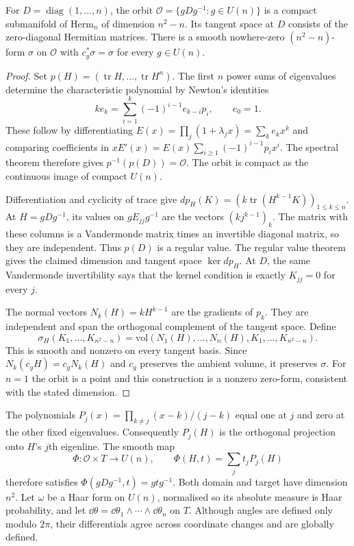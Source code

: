 \begin{lemma}\label{lem:orbit}
For $D=\operatorname{diag}(1,\ldots,n)$, the orbit
$\mathcal O=\{gDg^{-1}:g\in U(n)\}$ is a compact submanifold of
$\mathrm{Herm}_n$ of dimension $n^2-n$.
Its tangent space at $D$ consists of the zero-diagonal Hermitian matrices.
There is a smooth nowhere-zero $(n^2-n)$-form $\sigma$ on $\mathcal O$
with $c_g^*\sigma=\sigma$ for every $g\in U(n)$.
\end{lemma}
\begin{proof}
Set $p(H)=(\operatorname{tr}H,\ldots,\operatorname{tr}H^n)$.
The first $n$ power sums of eigenvalues determine the characteristic
polynomial by Newton's identities
\[
 ke_k=\sum_{i=1}^k(-1)^{i-1}e_{k-i}p_i,\qquad e_0=1.
\]
These follow by differentiating
$E(x)=\prod_j(1+\lambda_jx)=\sum_ke_kx^k$ and comparing coefficients
in $xE'(x)=E(x)\sum_{i\ge1}(-1)^{i-1}p_ix^i$.
The spectral theorem therefore gives $p^{-1}(p(D))=\mathcal O$.
The orbit is compact as the continuous image of compact $U(n)$.

Differentiation and cyclicity of trace give
$dp_H(K)=(k\operatorname{tr}(H^{k-1}K))_{1\le k\le n}$.
At $H=gDg^{-1}$, its values on $gE_{jj}g^{-1}$ are the vectors
$(kj^{k-1})_k$. The matrix with these columns is a Vandermonde matrix
times an invertible diagonal matrix, so they are independent.
Thus $p(D)$ is a regular value. The regular value theorem gives the
claimed dimension and tangent space $\ker dp_H$.
At $D$, the same Vandermonde invertibility says that the kernel condition
is exactly $K_{jj}=0$ for every $j$.

The normal vectors $N_k(H)=kH^{k-1}$ are the gradients of $p_k$.
They are independent and span the orthogonal complement of the tangent
space. Define
\[
 \sigma_H(K_1,\ldots,K_{n^2-n})
 =\mathrm{vol}(N_1(H),\ldots,N_n(H),K_1,\ldots,K_{n^2-n}).
\]
This is smooth and nonzero on every tangent basis.
Since $N_k(c_gH)=c_gN_k(H)$ and $c_g$ preserves the ambient volume,
it preserves $\sigma$. For $n=1$ the orbit is a point and this construction
is a nonzero zero-form, consistent with the stated dimension.
\end{proof}

The polynomials $P_j(x)=\prod_{k\ne j}(x-k)/(j-k)$ equal one at $j$
and zero at the other fixed eigenvalues. Consequently $P_j(H)$ is the
orthogonal projection onto $H$'s $j$th eigenline.
The smooth map
\[
 \Phi:\mathcal O\times T\longrightarrow U(n),\qquad
 \Phi(H,t)=\sum_jt_jP_j(H)
\]
therefore satisfies $\Phi(gDg^{-1},t)=gtg^{-1}$.
Both domain and target have dimension $n^2$.
Let $\omega$ be a Haar form on $U(n)$, normalised so its absolute measure
is Haar probability, and let
$\dd\theta=\dd\theta_1\wedge\cdots\wedge\dd\theta_n$ on $T$.
Although angles are defined only modulo $2\pi$, their differentials agree
across coordinate changes and are globally defined.

